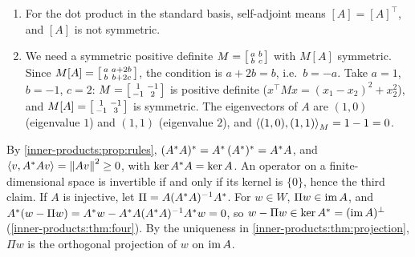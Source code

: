 \begin{enumerate}[nosep]
  \item For the dot product in the standard basis, self-adjoint means
        $[A] = [A]^\top$, and $[A]$ is not symmetric.
  \item We need a symmetric positive definite
        $M = \begin{bsmallmatrix}a & b\\b & c\end{bsmallmatrix}$ with
        $M[A]$ symmetric. Since
        $M[A] = \begin{bsmallmatrix}a & a + 2b\\b & b + 2c
        \end{bsmallmatrix}$, the condition is $a + 2b = b$, i.e.\
        $b = -a$. Take $a = 1$, $b = -1$, $c = 2$:
        $M = \begin{bsmallmatrix}1 & -1\\-1 & 2\end{bsmallmatrix}$ is
        positive definite ($x^\top Mx = (x_1 - x_2)^2 + x_2^2$), and
        $M[A] = \begin{bsmallmatrix}1 & -1\\-1 & 3\end{bsmallmatrix}$ is
        symmetric. The eigenvectors of $A$ are $(1, 0)$ (eigenvalue $1$)
        and $(1, 1)$ (eigenvalue $2$), and
        $\left\langle (1, 0), (1, 1) \right\rangle_M = 1 - 1 = 0$.
\end{enumerate}

By \cref{inner-products:prop:rules},
$(A^{*}A)^{*} = A^{*}\,(A^{*})^{*} = A^{*}A$, and
$\left\langle v, A^{*}Av \right\rangle = \left\|Av\right\|^2\geq0$, with $\ker A^{*}A = \ker A$. An
operator on a finite-dimensional space is invertible if and only if its
kernel is $\{0\}$, hence the third claim. If $A$ is injective, let
$\Pi = A(A^{*}A)^{-1}A^{*}$. For $w\in W$, $\Pi w\in\operatorname{im} A$, and
$A^{*}(w - \Pi w) = A^{*}w - A^{*}A(A^{*}A)^{-1}A^{*}w = 0$, so
$w - \Pi w\in\ker A^{*} = (\operatorname{im} A)^\perp$
(\cref{inner-products:thm:four}). By the uniqueness in
\cref{inner-products:thm:projection}, $\Pi w$ is the orthogonal
projection of $w$ on $\operatorname{im} A$.

